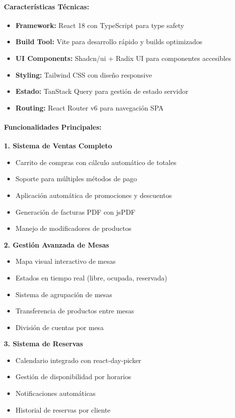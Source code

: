 \documentclass[12pt,a4paper]{article}
\begin{document}
\paragraph{Características Técnicas:}
\begin{itemize}
    \item \textbf{Framework:} React 18 con TypeScript para type safety
    \item \textbf{Build Tool:} Vite para desarrollo rápido y builds optimizados
    \item \textbf{UI Components:} Shadcn/ui + Radix UI para componentes accesibles
    \item \textbf{Styling:} Tailwind CSS con diseño responsive
    \item \textbf{Estado:} TanStack Query para gestión de estado servidor
    \item \textbf{Routing:} React Router v6 para navegación SPA
\end{itemize}

\paragraph{Funcionalidades Principales:}

\textbf{1. Sistema de Ventas Completo}
\begin{itemize}
    \item Carrito de compras con cálculo automático de totales
    \item Soporte para múltiples métodos de pago
    \item Aplicación automática de promociones y descuentos
    \item Generación de facturas PDF con jsPDF
    \item Manejo de modificadores de productos
\end{itemize}

\textbf{2. Gestión Avanzada de Mesas}
\begin{itemize}
    \item Mapa visual interactivo de mesas
    \item Estados en tiempo real (libre, ocupada, reservada)
    \item Sistema de agrupación de mesas
    \item Transferencia de productos entre mesas
    \item División de cuentas por mesa
\end{itemize}

\textbf{3. Sistema de Reservas}
\begin{itemize}
    \item Calendario integrado con react-day-picker
    \item Gestión de disponibilidad por horarios
    \item Notificaciones automáticas
    \item Historial de reservas por cliente
\end{itemize}
\end{document}
